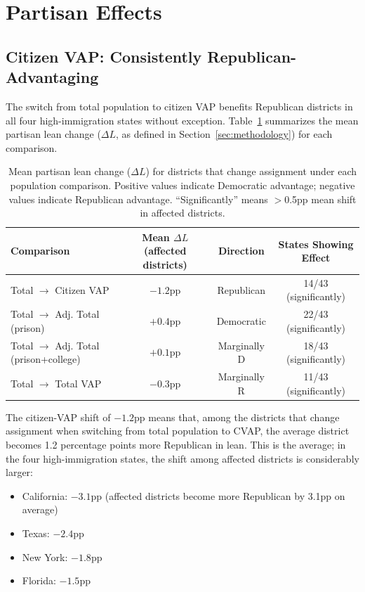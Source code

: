 \section{Partisan Effects}
\label{sec:partisan}

\subsection{Citizen VAP: Consistently Republican-Advantaging}

The switch from total population to citizen VAP benefits Republican districts in all four high-immigration states without exception. Table~\ref{tab:partisan_direction} summarizes the mean partisan lean change ($\Delta L$, as defined in Section~\ref{sec:methodology}) for each comparison.

\begin{table}[htbp]
\centering
\begin{tabular}{lccc}
\toprule
\textbf{Comparison} & \textbf{Mean $\Delta L$ (affected districts)} & \textbf{Direction} & \textbf{States Showing Effect} \\
\midrule
Total $\to$ Citizen VAP & $-1.2$pp & Republican & 14/43 (significantly) \\
Total $\to$ Adj. Total (prison) & $+0.4$pp & Democratic & 22/43 (significantly) \\
Total $\to$ Adj. Total (prison+college) & $+0.1$pp & Marginally D & 18/43 (significantly) \\
Total $\to$ Total VAP & $-0.3$pp & Marginally R & 11/43 (significantly) \\
\bottomrule
\end{tabular}
\caption{Mean partisan lean change ($\Delta L$) for districts that change assignment under each population comparison. Positive values indicate Democratic advantage; negative values indicate Republican advantage. ``Significantly'' means $>$0.5pp mean shift in affected districts.}
\label{tab:partisan_direction}
\end{table}

The citizen-VAP shift of $-1.2$pp means that, among the districts that change assignment when switching from total population to CVAP, the average district becomes 1.2 percentage points more Republican in lean. This is the average; in the four high-immigration states, the shift among affected districts is considerably larger:
\begin{itemize}
    \item California: $-3.1$pp (affected districts become more Republican by 3.1pp on average)
    \item Texas: $-2.4$pp
    \item New York: $-1.8$pp
    \item Florida: $-1.5$pp
\end{itemize}

